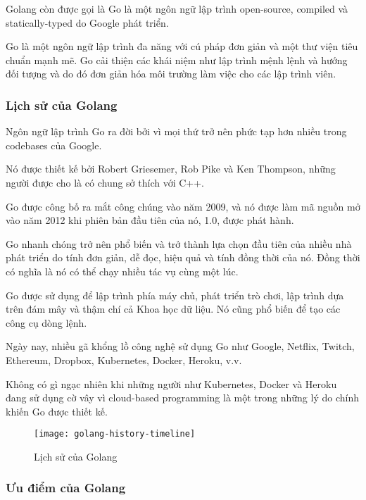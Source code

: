 Golang còn được gọi là Go là một ngôn ngữ lập trình open-source, compiled và statically-typed do Google phát triển.

Go là một ngôn ngữ lập trình đa năng với cú pháp đơn giản và một thư viện tiêu chuẩn mạnh mẽ. Go cải thiện các khái niệm như lập trình mệnh lệnh và hướng đối tượng và do đó đơn giản hóa môi trường làm việc cho các lập trình viên.

\subsubsection{Lịch sử của Golang}

Ngôn ngữ lập trình Go ra đời bởi vì mọi thứ trở nên phức tạp hơn nhiều trong codebases của Google.

Nó được thiết kế bởi Robert Griesemer, Rob Pike và Ken Thompson, những người được cho là có chung sở thích với C++.

Go được công bố ra mắt công chúng vào năm 2009, và nó được làm mã nguồn mở vào năm 2012 khi phiên bản đầu tiên của nó, 1.0, được phát hành.

Go nhanh chóng trở nên phổ biến và trở thành lựa chọn đầu tiên của nhiều nhà phát triển do tính đơn giản, dễ đọc, hiệu quả và tính đồng thời của nó. Đồng thời có nghĩa là nó có thể chạy nhiều tác vụ cùng một lúc.

Go được sử dụng để lập trình phía máy chủ, phát triển trò chơi, lập trình dựa trên đám mây và thậm chí cả Khoa học dữ liệu. Nó cũng phổ biến để tạo các công cụ dòng lệnh.

Ngày nay, nhiều gã khổng lồ công nghệ sử dụng Go như Google, Netflix, Twitch, Ethereum, Dropbox, Kubernetes, Docker, Heroku, v.v.

Không có gì ngạc nhiên khi những người như Kubernetes, Docker và Heroku đang sử dụng cờ vây vì cloud-based programming là một trong những lý do chính khiến Go được thiết kế.

\begin{figure}[ht]
	\centering
	\texttt{[image: golang-history-timeline]}
	\caption{Lịch sử của Golang}
\end{figure}

\subsubsection{Ưu điểm của Golang}


